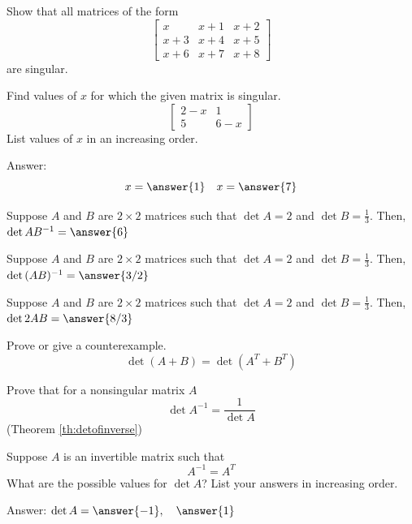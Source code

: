 \documentclass{ximera}
\begin{document}
\begin{problem}\label{prob:singmatrixdet2} Show that all matrices of the form
$$\begin{bmatrix}x&x+1&x+2\\x+3&x+4&x+5\\x+6&x+7&x+8\end{bmatrix}$$
are singular.
\end{problem}

\begin{problem}\label{prob:singmatrixdet3}
Find values of $x$ for which the given matrix is singular.
$$\begin{bmatrix}2-x&1\\5&6-x\end{bmatrix}$$
List values of $x$ in an increasing order.

Answer:
$$x=\answer{1}\quad x=\answer{7}$$
\end{problem}

  \begin{problem}\label{prob:detproduct1a} Suppose $A$ and $B$ are $2\times 2$ matrices such that $\det{A}=2$ and $\det{B}=\frac{1}{3}$.  Then,
  $\det{AB^{-1}}=\answer{6}$
  \end{problem}
  
   \begin{problem}\label{prob:detproduct1b} Suppose $A$ and $B$ are $2\times 2$ matrices such that $\det{A}=2$ and $\det{B}=\frac{1}{3}$.  Then,
  $\det{(AB)^{-1}}=\answer{3/2}$
  \end{problem}
  
   \begin{problem}\label{prob:detproduct1c} Suppose $A$ and $B$ are $2\times 2$ matrices such that $\det{A}=2$ and $\det{B}=\frac{1}{3}$. Then,
  $\det{2AB}=\answer{8/3}$
  \end{problem}


\begin{problem}\label{prob:dettruefalse}
Prove or give a counterexample.
   $$\det{(A+B)}=\det{(A^T+B^T)}$$
  
\end{problem}

\begin{problem}\label{prob:proofdetofinverse}
Prove that for a nonsingular matrix $A$ 
$$\det{A^{-1}}=\frac{1}{\det{A}}$$ (Theorem \ref{th:detofinverse})
\end{problem}

\begin{problem}\label{prob:detinvertible1}
Suppose $A$ is an invertible matrix such that $$A^{-1}=A^T$$
What are the possible values for $\det{A}$?  List your answers in increasing order.

Answer: $\det{A}=\answer{-1},\quad\answer{1}$
\end{problem}
\end{document}

